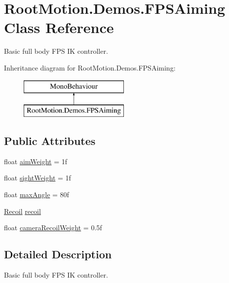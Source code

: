 \hypertarget{class_root_motion_1_1_demos_1_1_f_p_s_aiming}{}\section{Root\+Motion.\+Demos.\+F\+P\+S\+Aiming Class Reference}
\label{class_root_motion_1_1_demos_1_1_f_p_s_aiming}


Basic full body F\+PS IK controller.  


Inheritance diagram for Root\+Motion.\+Demos.\+F\+P\+S\+Aiming\+:\begin{figure}[H]
\begin{center}
\leavevmode
\includegraphics[height=2.000000cm]{class_root_motion_1_1_demos_1_1_f_p_s_aiming}
\end{center}
\end{figure}
\subsection*{Public Attributes}
\begin{DoxyCompactItemize}
\item 
float \mbox{\hyperlink{class_root_motion_1_1_demos_1_1_f_p_s_aiming_af39807c2c9f238249017e4a69ac7c7b1}{aim\+Weight}} = 1f
\item 
float \mbox{\hyperlink{class_root_motion_1_1_demos_1_1_f_p_s_aiming_a145f42f9fa98e3107bb1966dc7ace1d3}{sight\+Weight}} = 1f
\item 
float \mbox{\hyperlink{class_root_motion_1_1_demos_1_1_f_p_s_aiming_ab28a529fb832601c81202696d792d1a3}{max\+Angle}} = 80f
\item 
\mbox{\hyperlink{class_root_motion_1_1_final_i_k_1_1_recoil}{Recoil}} \mbox{\hyperlink{class_root_motion_1_1_demos_1_1_f_p_s_aiming_a0fedd3012297add881556a5ff8d27b61}{recoil}}
\item 
float \mbox{\hyperlink{class_root_motion_1_1_demos_1_1_f_p_s_aiming_aa0748cd8c090bce863166c077a19b530}{camera\+Recoil\+Weight}} = 0.\+5f
\end{DoxyCompactItemize}


\subsection{Detailed Description}
Basic full body F\+PS IK controller. 

